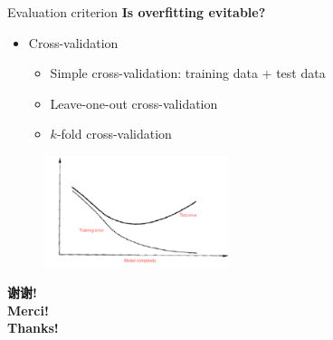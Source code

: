 \documentclass{beamer}
\begin{document}
\begin{frame}{Evaluation criterion}
\textbf{Is overfitting evitable?}
\begin{itemize}
\item Cross-validation
\begin{itemize}
\item Simple cross-validation: training data + test data
\item Leave-one-out cross-validation
\item $k$-fold cross-validation
\end{itemize}
\end{itemize}
\begin{figure}
\centering
\includegraphics[width=5.4cm]{ep19.png}
\end{figure}
\end{frame}


\begin{frame}{}
\begin{center}
    \textbf{谢谢!}\\
    \textbf{Merci!}\\
    \textbf{Thanks!}
\end{center}
\end{frame}
\end{document}
